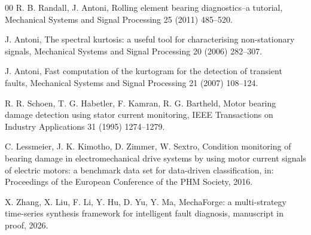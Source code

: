\documentclass[review,3p,times]{elsarticle}
\begin{document}
\begin{thebibliography}{00}
R. B. Randall, J. Antoni, Rolling element bearing diagnostics--a tutorial,
Mechanical Systems and Signal Processing 25 (2011) 485--520.

J. Antoni, The spectral kurtosis: a useful tool for characterising
non-stationary signals, Mechanical Systems and Signal Processing 20 (2006)
282--307.

J. Antoni, Fast computation of the kurtogram for the detection of transient
faults, Mechanical Systems and Signal Processing 21 (2007) 108--124.

R. R. Schoen, T. G. Habetler, F. Kamran, R. G. Bartheld, Motor bearing damage
detection using stator current monitoring, IEEE Transactions on Industry
Applications 31 (1995) 1274--1279.

C. Lessmeier, J. K. Kimotho, D. Zimmer, W. Sextro, Condition monitoring of
bearing damage in electromechanical drive systems by using motor current
signals of electric motors: a benchmark data set for data-driven
classification, in: Proceedings of the European Conference of the PHM
Society, 2016.

X. Zhang, X. Liu, F. Li, Y. Hu, D. Yu, Y. Ma, MechaForge: a multi-strategy
time-series synthesis framework for intelligent fault diagnosis, manuscript in
proof, 2026.

\end{thebibliography}
\end{document}
